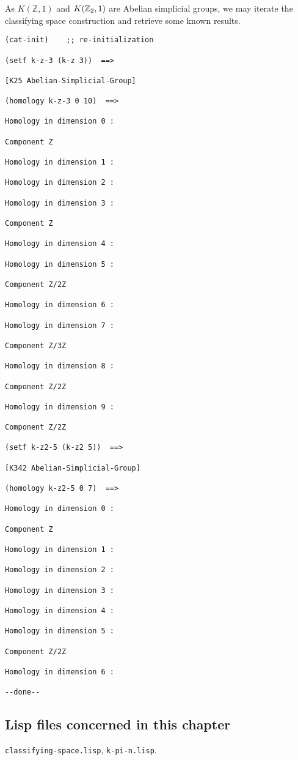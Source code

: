 As $K(\mathbb{Z}, 1)$ and $K({{\mathbb{Z}}_2}, 1)$ are Abelian simplicial groups, we may iterate the classifying
space construction and retrieve some known results.
{\footnotesize\begin{verbatim}
(cat-init)    ;; re-initialization

(setf k-z-3 (k-z 3))  ==>

[K25 Abelian-Simplicial-Group]

(homology k-z-3 0 10)  ==>

Homology in dimension 0 :

Component Z

Homology in dimension 1 :

Homology in dimension 2 :

Homology in dimension 3 :

Component Z

Homology in dimension 4 :

Homology in dimension 5 :

Component Z/2Z

Homology in dimension 6 :

Homology in dimension 7 :

Component Z/3Z

Homology in dimension 8 :

Component Z/2Z

Homology in dimension 9 :

Component Z/2Z

(setf k-z2-5 (k-z2 5))  ==>

[K342 Abelian-Simplicial-Group]

(homology k-z2-5 0 7)  ==>

Homology in dimension 0 :

Component Z

Homology in dimension 1 :

Homology in dimension 2 :

Homology in dimension 3 :

Homology in dimension 4 :

Homology in dimension 5 :

Component Z/2Z

Homology in dimension 6 :

--done--
\end{verbatim}}

\subsection* {Lisp files concerned in this chapter}

{\tt classifying-space.lisp}, {\tt k-pi-n.lisp}.
